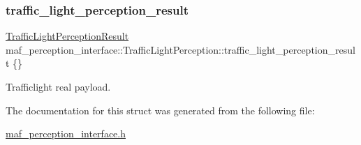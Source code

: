 \subsubsection{\texorpdfstring{traffic\+\_\+light\+\_\+perception\+\_\+result}{traffic\_light\_perception\_result}}
{\footnotesize\ttfamily \hyperlink{structmaf__perception__interface_1_1TrafficLightPerceptionResult}{Traffic\+Light\+Perception\+Result} maf\+\_\+perception\+\_\+interface\+::\+Traffic\+Light\+Perception\+::traffic\+\_\+light\+\_\+perception\+\_\+result \{\}}



Trafficlight real payload. 



The documentation for this struct was generated from the following file\+:\begin{DoxyCompactItemize}
\item 
\hyperlink{maf__perception__interface_8h}{maf\+\_\+perception\+\_\+interface.\+h}\end{DoxyCompactItemize}
